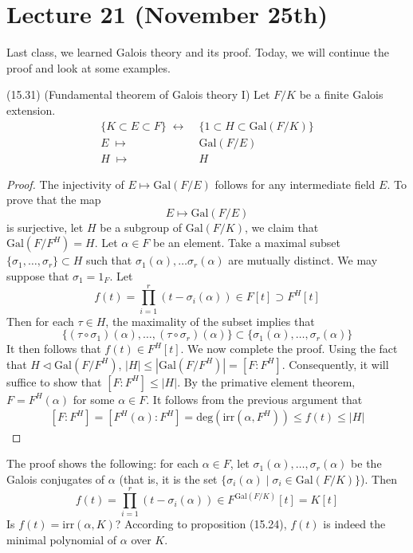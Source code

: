 \section{Lecture 21 (November 25th)}
\begin{rmk}
Last class, we learned Galois theory and its proof. Today, we will continue the proof and look at some examples.
\end{rmk}
\vspace{2ex}
\begin{thm}
(15.31) (Fundamental theorem of Galois theory I) Let $F/K$ be a finite Galois extension.
\[\begin{align*}
\{K\subset E\subset F\}\;\leftrightarrow &\;\{1\subset H\subset \mathrm{Gal}(F/K)\}\\
E\;\mapsto&\; \mathrm{Gal}(F/E)\\
H\;\mapsto&\; H
\end{align*}\]
\end{thm}
\vspace{2ex}
\begin{proof}
The injectivity of $E\mapsto \mathrm{Gal}(F/E)$ follows for any intermediate field $E$. To prove that the map 
\[E\mapsto \mathrm{Gal}(F/E)\]
is surjective, let $H$ be a subgroup of $\mathrm{Gal}(F/K)$, we claim that $\mathrm{Gal}(F/F^{H})=H$. Let $\alpha \in F$ be an element. Take a maximal subset $\{\sigma_1,\ldots ,\sigma_{r}\}\subset H$ such that $\sigma_1(\alpha),\ldots \sigma_{r}(\alpha )$ are mutually distinct. We may suppose that $\sigma_{1}=\mathrm{1}_{F}$. Let 
\[f(t)=\prod^{r}_{i=1}(t-\sigma_{i} (\alpha ))\in F[t]\supset F^{H}[t]\]
Then for each $\tau \in H$, the maximality of the subset implies that
\[\{(\tau \circ\sigma_1)(\alpha ),\ldots ,(\tau \circ\sigma _{r})(\alpha )\}\subset \{\sigma_1(\alpha ),\ldots ,\sigma _{r}(\alpha )\}\]
It then follows that $f(t)\in F^{H}[t]$. We now complete the proof. Using the fact that $H\triangleleft \mathrm{Gal}(F/F^{H})$, $|H|\leq  |\mathrm{Gal}(F/F^{H})|=[F:F^{H}]$. Consequently, it will suffice to show that $[F:F^{H}]\leq |H|$. By the primative element theorem, $F=F^{H}(\alpha )$ for some $\alpha \in F$. It follows from the previous argument that
\[\begin{align*}
[F:F^{H}]=[F^{H}(\alpha ):F^{H}]=\mathrm{deg}(\mathrm{irr}(\alpha ,F^{H}))
\leq f(t)
\leq|H|
\end{align*}\]
\end{proof}
\vspace{2ex}
\begin{rmk}
The proof shows the following: for each $\alpha \in F$, let $\sigma_1(\alpha ),\ldots ,\sigma _{r}(\alpha )$ be the Galois conjugates of $\alpha $ (that is, it is the set $\{\sigma _{i}(\alpha )\;|\;\sigma _{i}\in \mathrm{Gal}(F/K)\}$). Then 
\[f(t)=\prod^{r}_{i=1}(t-\sigma _{i}(\alpha ))\in F^{\mathrm{Gal}(F/K)}[t]=K[t]\]
Is $f(t)=\mathrm{irr}(\alpha ,K)$? According to proposition (15.24), $f(t)$ is indeed the minimal polynomial of $\alpha $ over $K$. 
\end{rmk}
\vspace{2ex}


